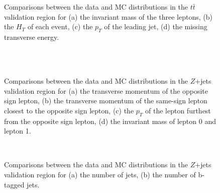 \begin{figure}[H]
    \\
    \\
    \caption{Comparisons between the data and MC distributions in the $t\bar{t}$ validation region for (a) the invariant mass of the three leptons, (b) the $H_T$ of each event, (c) the $p_T$ of the leading jet, (d) the missing transverse energy.}    
    \end{figure}
\begin{figure}[H]
    \\
    \\
    \caption{Comparisons between the data and MC distributions in the $Z$+jets validation region for (a) the transverse momentum of the opposite sign lepton, (b) the transverse momentum of the same-sign lepton closest to the opposite sign lepton, (c) the $p_T$ of the lepton furthest from the opposite sign lepton, (d) the invariant mass of lepton 0 and lepton 1.}
\end{figure}
\begin{figure}[H]
    \\
    \caption{Comparisons between the data and MC distributions in the $Z$+jets validation region for (a) the number of jets, (b) the number of b-tagged jets.}
    \label{zjets_kinematics}
\end{figure}

